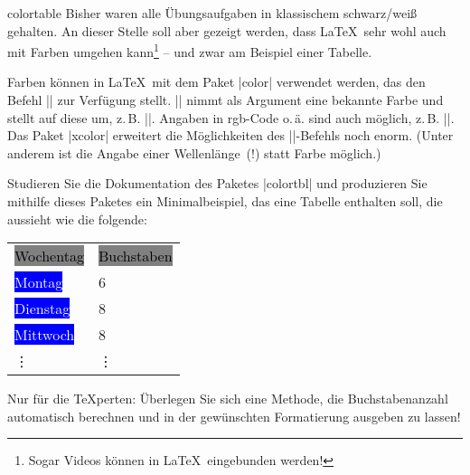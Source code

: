 \documentclass[
	blatt=5,
	ausgabe=14.\,05.\,2010,
	rückgabe=21.\,05.\,2010
]{lcourse-hd}
\begin{document}
\begin{exercise}[
  name={Tabellen – in Farbe!},
  punkte=5,
  abgabe = Quellcode per Mail{,} Quellcode und fertiges Dokument (schwarz-weiß) ausgedruckt.]{colortable}
Bisher waren alle Übungsaufgaben in klassischem schwarz/weiß gehalten. An dieser Stelle soll aber gezeigt werden, dass \LaTeX\ sehr wohl auch mit Farben umgehen kann\footnote{Sogar Videos können in \LaTeX\ eingebunden werden!} – und zwar am Beispiel einer Tabelle.

Farben können in \LaTeX\ mit dem Paket |color| verwendet werden, das den Befehl |\color{}| zur Verfügung stellt. |\color{}| nimmt als Argument eine bekannte Farbe und stellt auf diese um, z.\,B. |\color{blue}|. Angaben in rgb-Code o.\,ä. sind auch möglich, z.\,B. |\color[gray]{0.8}|. Das Paket |xcolor| erweitert die Möglichkeiten des |\color|-Befehls noch enorm. (Unter anderem ist die Angabe einer Wellenlänge~(!) statt Farbe möglich.)

Studieren Sie die Dokumentation des Paketes |colortbl| und produzieren Sie mithilfe dieses Paketes ein Minimalbeispiel, das eine Tabelle enthalten soll, die aussieht wie die folgende: %
\par
\centering
\begin{tabular}{l!{\hspace*{-4.3mm}}l}
\colorbox{gray}{\textcolor{black}{Wochentag}} & \colorbox{gray}{\textcolor{black}{Buchstaben\vphantom{Wg}}}\\
\colorbox{blue}{\textcolor{white}{Montag\hspace*{.8em}}} & 6 \\
\colorbox{blue}{\textcolor{white}{Dienstag\hspace*{.34em}}} & 8\\
\colorbox{blue}{\textcolor{white}{Mittwoch}} &  8\\
\vdots & \vdots \\
\end{tabular}
Nur für die \TeX perten: Überlegen Sie sich eine Methode, die Buchstabenanzahl automatisch berechnen und in der gewünschten Formatierung ausgeben zu lassen!
\end{exercise}
\end{document}
